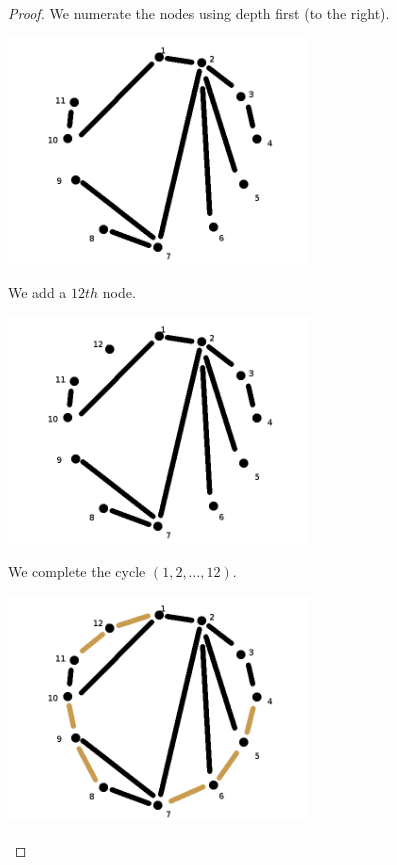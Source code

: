 \begin{proof}
    We numerate the nodes using depth first (to the right).
    
    \begin{center}
        \includegraphics[width=8cm]{Homework1/Problem4/PlanarRootedTreeToTriangulation2.png}
    \end{center}
    
    We add a $12th$ node.
    
    \begin{center}
        \includegraphics[width=8cm]{Homework1/Problem4/PlanarRootedTreeToTriangulation3.png}
    \end{center}
    
    We complete the cycle $(1, 2, \dots, 12)$.
    
    \begin{center}
        \includegraphics[width=8cm]{Homework1/Problem4/PlanarRootedTreeToTriangulation4.png}
    \end{center}
    

\end{proof}
